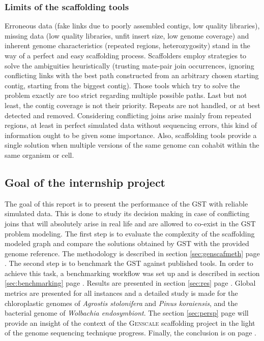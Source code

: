 \documentclass[12pt]{article}
\newcommand*{\fulleref}[1]{section \hyperref[{#1}] {\ref*{#1}} page {\pageref{#1}}}%
\begin{document}
\subsubsection{Limits of the scaffolding tools}
 Erroneous data (fake links due to poorly assembled contigs, low quality libraries), missing data (low quality libraries, unfit insert size, low genome coverage) and inherent genome characteristics (repeated regions,  heterozygosity) stand in the way of a perfect and easy scaffolding process.  Scaffolders employ strategies to solve the ambiguities heuristically (trusting mate-pair join occurrences, ignoring conflicting links with the best path constructed from an arbitrary chosen starting contig, starting from the biggest contig). Those tools which try to solve the problem exactly are too strict regarding multiple possible paths. Last but not least, the contig coverage is not their priority. Repeats are not handled, or at best detected and removed. Considering conflicting joins arise mainly from repeated regions, at least in perfect simulated data without sequencing errors, this kind of information ought to be given some importance. Also, scaffolding tools provide a single solution when multiple versions of the same genome can cohabit within the same organism or cell. 
 
\subsection{Goal of the internship project}
The goal of this report is to present the performance of the GST with reliable simulated data. This is done to study its decision making in case of conflicting joins that will absolutely arise in real life and are allowed to co-exist in the GST problem modeling. The first step is to evaluate the complexity of the scaffolding modeled graph and compare the solutions obtained by GST with the provided genome reference. The methodology is described in \fulleref{sec:genscafmeth}. The second step is to benchmark the GST against published tools. In order to achieve this task, a benchmarking workflow was set up and is described in \fulleref{sec:benchmarking}. Results are presented in \fulleref{sec:res}. Global metrics are presented for all instances and a detailed study is made for the chloroplastic genomes of \textit{Agrostis stolonifera} and \textit{Pinus koraiensis}, and the bacterial genome of \textit{Wolbachia endosymbiont}. The \fulleref{sec:persp} will provide an insight of the context of the \textsc{Genscale} scaffolding project in the light of the genome sequencing technique progress. Finally, the conclusion is on page \pageref{sec:conc}.
\end{document}
